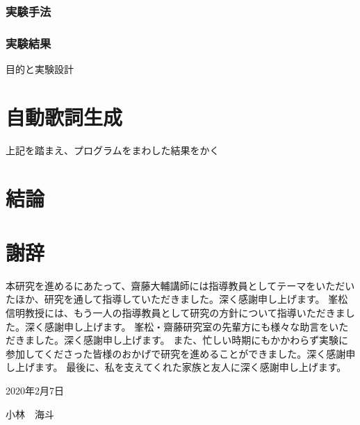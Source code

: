 \documentclass[10ptj,a4j,dvipdfmx,uplatex]{jsbook}
\begin{document}
\subsection{実験手法}
\subsection{実験結果}

目的と実験設計



\chapter{自動歌詞生成}
上記を踏まえ、プログラムをまわした結果をかく


\chapter{結論}


\chapter{謝辞}
本研究を進めるにあたって、齋藤大輔講師には指導教員としてテーマをいただいたほか、研究を通して指導していただきました。深く感謝申し上げます。
峯松信明教授には、もう一人の指導教員として研究の方針について指導いただきました。深く感謝申し上げます。
峯松・齋藤研究室の先輩方にも様々な助言をいただきました。深く感謝申し上げます。
また、忙しい時期にもかかわらず実験に参加してくださった皆様のおかげで研究を進めることができました。深く感謝申し上げます。
最後に、私を支えてくれた家族と友人に深く感謝申し上げます。

\begin{flushright}
2020年2月7日

小林　海斗
\end{flushright}


\end{document}
